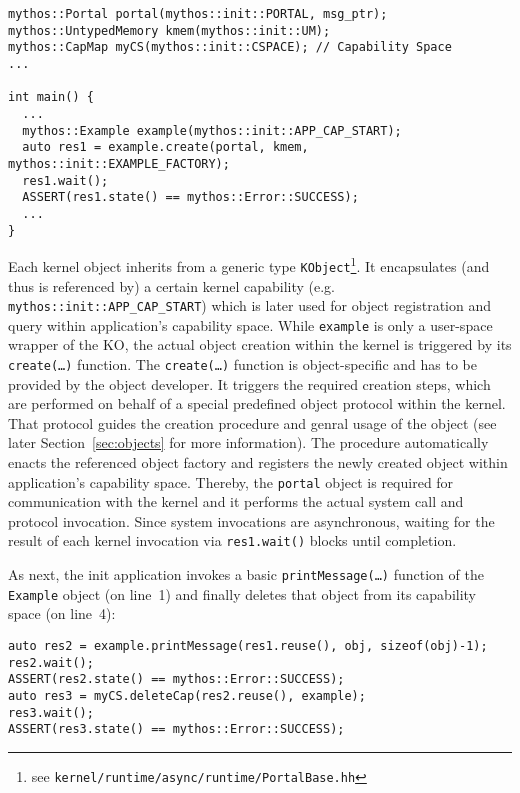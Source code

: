 \begin{lstlisting}
mythos::Portal portal(mythos::init::PORTAL, msg_ptr);
mythos::UntypedMemory kmem(mythos::init::UM);
mythos::CapMap myCS(mythos::init::CSPACE); // Capability Space
...

int main() {
  ...
  mythos::Example example(mythos::init::APP_CAP_START);
  auto res1 = example.create(portal, kmem, mythos::init::EXAMPLE_FACTORY);
  res1.wait();
  ASSERT(res1.state() == mythos::Error::SUCCESS);
  ...
}
\end{lstlisting}

\noindent Each kernel object inherits from a generic type
\texttt{KObject}\footnote{see
\texttt{kernel/runtime/async/runtime/PortalBase.hh}}.
It encapsulates (and thus is referenced by) a certain kernel capability (e.g.
\texttt{mythos::init::APP\_CAP\_START}) which is later used for object
registration and query within application's capability space. While
\texttt{example} is only a user-space wrapper of the KO, the actual object
creation within the kernel is triggered by its \texttt{create(\ldots)} function.
The \texttt{create(\ldots)} function is object-specific and has to be provided
by the object developer. It triggers the required creation steps, which are
performed on behalf of a special predefined object protocol within the kernel.
That protocol guides the creation procedure and genral usage of the object (see
later Section~\ref{sec:objects} for more information). The procedure
automatically enacts the referenced object factory and registers the newly
created object within application's capability space.
Thereby, the \texttt{portal} object is required for communication with the
kernel and it performs the actual system call and protocol invocation. Since
system invocations are asynchronous, waiting for the result of each kernel
invocation via \texttt{res1.wait()} blocks until completion.

As next, the init application invokes a basic \texttt{printMessage(\ldots)}
function of the \texttt{Example} object (on line~1) and finally deletes that
object from its capability space (on line~4):

\lstset{language=c++}
\begin{lstlisting}
auto res2 = example.printMessage(res1.reuse(), obj, sizeof(obj)-1);
res2.wait();
ASSERT(res2.state() == mythos::Error::SUCCESS);
auto res3 = myCS.deleteCap(res2.reuse(), example);
res3.wait();
ASSERT(res3.state() == mythos::Error::SUCCESS);
\end{lstlisting}

